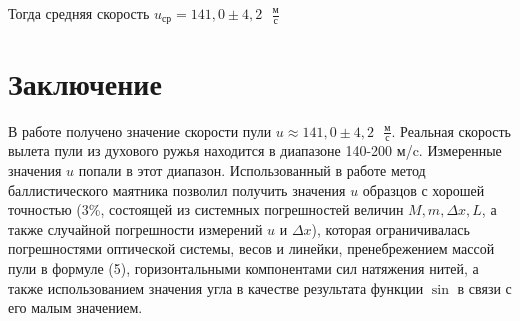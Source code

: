 \documentclass[
	a4paper, %
	12pt, %
]{article}
\begin{document}
	Тогда средняя скорость $u_\text{ср} = 141,0 \pm 4,2\text{ }\frac{\text{м}}{\text{с}} $
	
	\section{Заключение}
	В работе получено значение скорости пули $u\approx 141,0 \pm 4,2\text{ }\frac{\text{м}}{\text{с}}$. Реальная скорость вылета пули из духового ружья находится в диапазоне 140-200 м/c. Измеренные значения $u$ попали в этот диапазон. Использованный в работе метод баллистического маятника позволил получить значения $u$ образцов с хорошей точностью ({3}\%, состоящей из системных погрешностей величин $M, m, \Delta x, L$, а также случайной погрешности измерений $u$ и $\Delta x$), которая ограничивалась  погрешностями оптической системы, весов и линейки, пренебрежением массой пули в формуле (5), горизонтальными компонентами сил натяжения нитей, а также использованием значения угла в качестве результата функции $\sin$ в связи с его малым значением.
	
	
\end{document}

